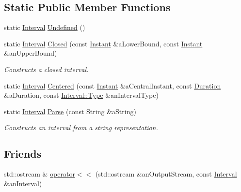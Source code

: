 \subsection*{Static Public Member Functions}
\begin{DoxyCompactItemize}
\item 
static \hyperlink{classlibrary_1_1physics_1_1time_1_1_interval}{Interval} \hyperlink{classlibrary_1_1physics_1_1time_1_1_interval_abe72d726e34919b4c8803e53af7fba66}{Undefined} ()
\item 
static \hyperlink{classlibrary_1_1physics_1_1time_1_1_interval}{Interval} \hyperlink{classlibrary_1_1physics_1_1time_1_1_interval_a89f1ca4a439fdc5224e60a441e757803}{Closed} (const \hyperlink{classlibrary_1_1physics_1_1time_1_1_instant}{Instant} \&a\+Lower\+Bound, const \hyperlink{classlibrary_1_1physics_1_1time_1_1_instant}{Instant} \&an\+Upper\+Bound)
\begin{DoxyCompactList}\small\item\em Constructs a closed interval. \end{DoxyCompactList}\item 
static \hyperlink{classlibrary_1_1physics_1_1time_1_1_interval}{Interval} \hyperlink{classlibrary_1_1physics_1_1time_1_1_interval_a052f385e80dea392c9ef5b52ed9443a1}{Centered} (const \hyperlink{classlibrary_1_1physics_1_1time_1_1_instant}{Instant} \&a\+Central\+Instant, const \hyperlink{classlibrary_1_1physics_1_1time_1_1_duration}{Duration} \&a\+Duration, const \hyperlink{classlibrary_1_1physics_1_1time_1_1_interval_aba490e7120a05be7b17a4d8076f25d48}{Interval\+::\+Type} \&an\+Interval\+Type)
\item 
static \hyperlink{classlibrary_1_1physics_1_1time_1_1_interval}{Interval} \hyperlink{classlibrary_1_1physics_1_1time_1_1_interval_a4f56de8af3b111650270abef273823bb}{Parse} (const String \&a\+String)
\begin{DoxyCompactList}\small\item\em Constructs an interval from a string representation. \end{DoxyCompactList}\end{DoxyCompactItemize}
\subsection*{Friends}
\begin{DoxyCompactItemize}
\item 
std\+::ostream \& \hyperlink{classlibrary_1_1physics_1_1time_1_1_interval_a4671ce6746f99155561a1bdfade9749a}{operator$<$$<$} (std\+::ostream \&an\+Output\+Stream, const \hyperlink{classlibrary_1_1physics_1_1time_1_1_interval}{Interval} \&an\+Interval)
\end{DoxyCompactItemize}


